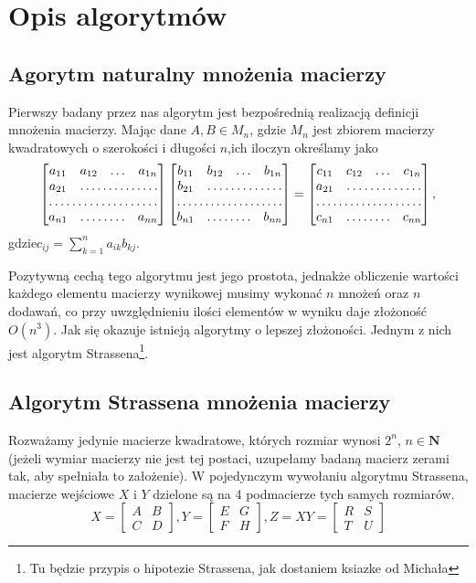 \section{Opis algorytmów}
\subsection{Agorytm naturalny mnożenia macierzy}
Pierwszy badany przez nas algorytm jest bezpośrednią realizacją definicji
mnożenia macierzy. Mając dane $A,B \in M_{n}$, gdzie $M_{n}$ jest zbiorem
macierzy kwadratowych o szerokości i długości $n$,ich iloczyn określamy jako
$$ \begin{bmatrix}
a_{11} & a_{12} & \ldots & a_{1n} \\
a_{21} & \hdotsfor{3} \\
\hdotsfor{4}\\
a_{n1} & \hdotsfor{2} & a_{nn} \end{bmatrix}
\begin{bmatrix}
b_{11} & b_{12} & \ldots & b_{1n} \\
b_{21} & \hdotsfor{3} \\
\hdotsfor{4}\\
b_{n1} & \hdotsfor{2} & b_{nn} \end{bmatrix}=
\begin{bmatrix}
c_{11} & c_{12} & \ldots & c_{1n} \\
a_{21} & \hdotsfor{3} \\
\hdotsfor{4}\\
c_{n1} & \hdotsfor{2} & c_{nn} \end{bmatrix},
$$
gdzie$c_{ij}=\sum_{k=1}^{n} a_{ik}b_{kj}$. 

Pozytywną cechą tego algorytmu jest jego prostota, jednakże obliczenie wartości
każdego elementu macierzy wynikowej musimy wykonać $n$ mnożeń oraz $n$ dodawań,
co przy uwzględnieniu ilości elementów w wyniku daje złożoność $O(n^3)$.
Jak się okazuje istnieją algorytmy o lepszej złożoności. Jednym z nich jest
algorytm Strassena\footnote{Tu będzie przypis o hipotezie Strassena, jak
dostaniem ksiazke od Michała}.
\subsection{Algorytm Strassena mnożenia macierzy}
Rozważamy jedynie macierze kwadratowe, których rozmiar wynosi $2^n$, $n \in
\mathbf{N}$ (jeżeli wymiar macierzy nie jest tej postaci, uzupełamy badaną
macierz zerami tak, aby spełniała to założenie). W pojedynczym wywołaniu
algorytmu Strassena, macierze wejściowe $X$ i $Y$ dzielone są na 4 podmacierze
tych samych rozmiarów.
$$X=\begin{bmatrix} A & B \\ C & D \end{bmatrix},	
Y=\begin{bmatrix} E & G \\ F & H \end{bmatrix},		
Z=XY=\begin{bmatrix} R & S \\ T & U \end{bmatrix}$$

